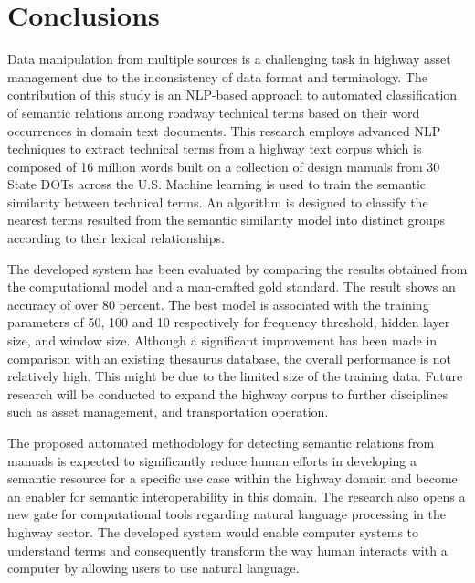 \documentclass[Journal, BackFigs,NoLists, DoubleSpace]{ascelike}%
\begin{document}
\section{Conclusions} \label{sec:conclns3} 
Data manipulation from multiple sources is a challenging task in highway asset management due to the inconsistency of data format and terminology. The contribution of this study is an NLP-based approach to automated classification of semantic relations among roadway technical terms based on their word occurrences in domain text documents. This research employs advanced NLP techniques to extract technical terms from a highway text corpus which is composed of 16 million words built on a collection of design manuals from 30 State DOTs across the U.S. Machine learning is used to train the semantic similarity between technical terms. An algorithm is designed to classify the nearest terms resulted from the semantic similarity model into distinct groups according to their lexical relationships. 
\par
The developed system has been evaluated by comparing the results obtained from the computational model and a man-crafted gold standard. The result shows an accuracy of over 80 percent. The best model is associated with the training parameters of 50, 100 and 10 respectively for frequency threshold, hidden layer size, and window size. Although a significant improvement has been made in comparison with an existing thesaurus database, the overall performance is not relatively high. This might be due to the limited size of the training data. Future research will be conducted to expand the highway corpus to further disciplines such as asset management, and transportation operation. 
\par
The proposed automated methodology for detecting semantic relations from manuals is expected to significantly reduce human efforts in developing a semantic resource for a specific use case within the highway domain and become an enabler for semantic interoperability in this domain. The research also opens a new gate for computational tools regarding natural language processing in the highway sector. The developed system would enable computer systems to understand terms and consequently transform the way human interacts with a computer by allowing users to use natural language.


%
%
\listoffigures
\end{document}
